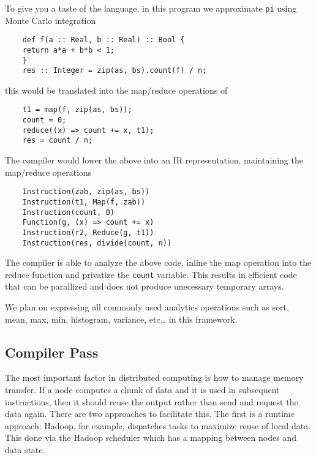To give you a taste of the language, in this program we approximate
\texttt{pi} using Monte Carlo integration

\begin{verbatim}
    def f(a :: Real, b :: Real) :: Bool {
    return a*a + b*b < 1;
    }
    res :: Integer = zip(as, bs).count(f) / n;
\end{verbatim}

this would be translated into the map/reduce operations of

\begin{verbatim}
    t1 = map(f, zip(as, bs));
    count = 0;
    reduce((x) => count += x, t1);
    res = count / n;
\end{verbatim}

The compiler would lower the above into an IR representation,
maintaining the map/reduce operations

\begin{verbatim}
    Instruction(zab, zip(as, bs))
    Instruction(t1, Map(f, zab))
    Instruction(count, 0)
    Function(g, (x) => count += x)
    Instruction(r2, Reduce(g, t1))
    Instruction(res, divide(count, n))
\end{verbatim}

The compiler is able to analyze the above code, inline the map operation
into the reduce function and privatize the \texttt{count} variable. This
results in efficient code that can be parallized and does not produce
unecessary temporary arrays.

We plan on expressing all commonly used analytics operations such as
sort, mean, max, min, histogram, variance, etc\ldots{} in this
framework.

\subsection{Compiler Pass}

The most important factor in distributed computing is how to manage
memory transfer. If a node computes a chunk of data and it is used in
subsequent instructions, then it should reuse the output rather than
send and request the data again. There are two approaches to facilitate
this. The first is a runtime approach: Hadoop, for example, dispatches
tasks to maximize reuse of local data. This done via the Hadoop
scheduler which has a mapping between nodes and data state.

